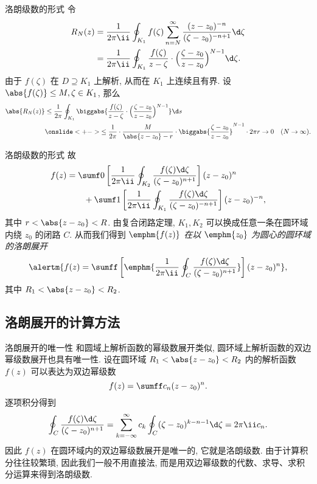 \begin{frame}{洛朗级数的形式}
	\onslide<+->
	令
	\begin{align*}
		R_N(z)&=\frac1{2\pi\ii}\oint_{K_1}f(\zeta)\sum_{n=N}^\infty\frac{(z-z_0)^{-n}}{(\zeta-z_0)^{-n+1}}\d\zeta\\
		&=\frac1{2\pi\ii}\oint_{K_1}\frac{f(\zeta)}{z-\zeta}\cdot\Bigl(\frac{\zeta-z_0}{z-z_0}\Bigr)^{N-1}\d\zeta.
	\end{align*}
	\onslide<+->
	由于 $f(\zeta)$ 在 $D\supseteq K_1$ 上解析, 从而在 $K_1$ 上连续且有界.
	\onslide<+->
	设 $\abs{f(\zeta)}\le M,\zeta\in K_1$,
	\onslide<+->
	那么
	\begin{align*}
		\abs{R_N(z)}&\le\frac 1{2\pi}\oint_{K_1}\biggabs{\frac{f(\zeta)}{z-\zeta}\cdot\Bigl(\frac{\zeta-z_0}{z-z_0}\Bigr)^{N-1}}\d s\\
		&\onslide<+->{\le\frac 1{2\pi}\cdot\frac M{\abs{z-z_0}-r}\cdot\biggabs{\frac{\zeta-z_0}{z-z_0}}^{N-1}\cdot 2\pi r\to 0\quad (N\to\infty).}
	\end{align*}
\end{frame}


\begin{frame}{洛朗级数的形式}
	\onslide<+->
	故
	\begin{align*}
		f(z)&=\sumf0\left[\frac1{2\pi\ii}\oint_{K_2}\frac{f(\zeta)\d\zeta}{(\zeta-z_0)^{n+1}}\right](z-z_0)^n\\
		&\qquad+\sumf1 \left[\frac1{2\pi\ii}\oint_{K_1}\frac{f(\zeta)\d\zeta}{(\zeta-z_0)^{-n+1}}\right](z-z_0)^{-n},
	\end{align*}
	其中 $r<\abs{z-z_0}<R$.
	\onslide<+->
	由复合闭路定理, $K_1,K_2$ 可以换成任意一条在圆环域内绕 $z_0$ 的闭路 $C$.
	\onslide<+->
	从而我们得到 \emph{$\emphm{f(z)}$ 在以 $\emphm{z_0}$ 为圆心的圆环域的洛朗展开}
	\[
		\alertm{f(z)=\sumff\left[\emphm{\frac1{2\pi\ii}\oint_C\frac{f(\zeta)\d\zeta}{(\zeta-z_0)^{n+1}}}\right](z-z_0)^n},
	\]
	其中 $R_1<\abs{z-z_0}<R_2$.
\end{frame}


\subsection{洛朗展开的计算方法}

\begin{frame}{洛朗展开的唯一性}
	\onslide<+->
	和圆域上解析函数的幂级数展开类似, 圆环域上解析函数的双边幂级数展开也具有唯一性.
	\onslide<+->
	设在圆环域 $R_1<\abs{z-z_0}<R_2$ 内的解析函数 $f(z)$ 可以表达为双边幂级数
	\[
		f(z)=\sumff c_n(z-z_0)^n.
	\]
	\onslide<+->
	逐项积分得到
	\[
		\oint_C\frac{f(\zeta)\d\zeta}{(\zeta-z_0)^{n+1}}
		=\sum_{k=-\infty}^\infty c_k\oint_C(\zeta-z_0)^{k-n-1}\d\zeta
		=2\pi\ii c_n.
	\]
	\onslide<+->
	因此 $f(z)$ 在圆环域内的\alert{双边幂级数展开是唯一的, 它就是洛朗级数}.
	\onslide<+->
	由于计算积分往往较繁琐, 因此我们一般不用直接法, 而是\alert{用双边幂级数的代数、求导、求积分运算}来得到洛朗级数.
\end{frame}


